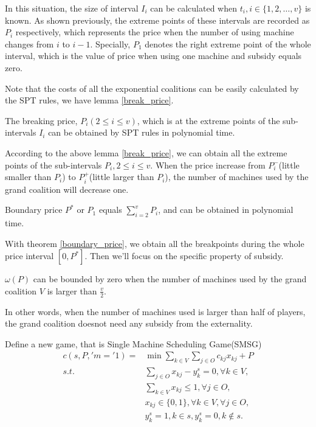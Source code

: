 In this situation, the size of interval $I_i$ can be calculated when $t_i,i \in \{1,2,\ldots,v\}$ is known. As shown previously, the extreme points of these intervals are recorded as $P_i$ respectively, which represents the price when the number of using machine changes from $i$ to $i-1$. Specially, $P_1$ denotes the right extreme point of the whole interval, which is the value of price when using one machine and subsidy equals zero.

Note that the costs of all the exponential coalitions can be easily calculated by the SPT rules, we have lemma \ref{break_price}.

\begin{lem}\label{break_price}
The breaking price, $P_i(2 \leq i \leq v)$, which is at the extreme points of the sub-intervals $I_i$ can be obtained by SPT rules in polynomial time.
\end{lem}

According to the above lemma \ref{break_price}, we can obtain all the extreme points of the sub-intervals $P_i, 2 \leq i \leq v$. When the price increase from $P_i^-$(little smaller than $P_i$) to $P_i^+$(little larger than $P_i$), the number of machines used by the grand coalition will decrease one.

\begin{thm}\label{boundary_price}
Boundary price $P^*$ or $P_1$ equals $\sum_{i=2}^v P_i$, and can be obtained in polynomial time.
\end{thm}

With theorem \ref{boundary_price}, we obtain all the breakpoints during the whole price interval $[0,P^*]$. Then we'll focus on the specific property of subsidy.

\begin{thm}\label{zero_subsidy}
$\omega(P)$ can be bounded by zero when the number of machines used by the grand coalition $V$ is larger than $\frac{v}{2}$.
\end{thm}

In other words, when the number of machines used is larger than half of players, the grand coalition doesnot need any subsidy from the externality.

Define a new game, that is Single Machine Scheduling Game(SMSG)
\[
\begin{aligned}
c(s,P,'m='1) = & {\min} \sum_{k\in V}\sum_{j\in O} {c_{kj} x_{kj} + P} \\
{s.t.}\quad & \sum_{j \in O} x_{kj}-y_k^s=0, \forall k \in V, \\
& \sum_{k\in V} x_{kj} \leq 1, \forall j \in O,  \\
& x_{kj} \in \{0,1\} , \forall k \in V, \forall j \in O,\\
& y_k^s=1, k \in s, y_k^s=0, k \notin s.
\end{aligned}
\]

